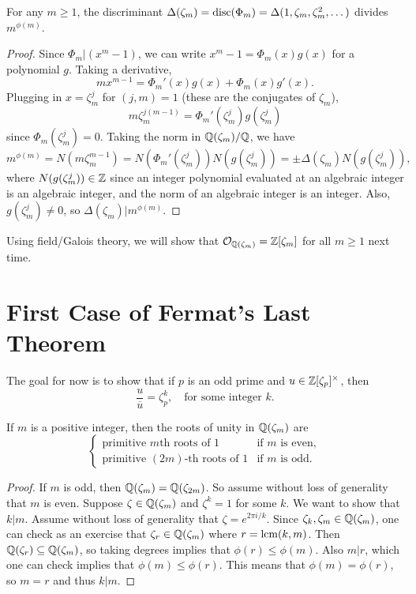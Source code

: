 \begin{lemma}
  For any $m \ge 1$, the
  discriminant $\Delta(\zeta_m) = \operatorname{disc}(\Phi_m) = \Delta(1, \zeta_m, \zeta_m^2, \dots)$
  divides $m^{\phi(m)}$.
\end{lemma}

\begin{proof}
  Since $\Phi_m | (x^m - 1)$, we can write
  $x^m - 1 = \Phi_m(x) g(x)$ for a polynomial $g$.
  Taking
  a derivative,
  \[
    mx^{m - 1} = \Phi_m'(x) g(x) + \Phi_m(x) g'(x).
  \]
  Plugging in $x = \zeta_m^j$ for $(j, m) = 1$ (these
  are the conjugates of $\zeta_m$),
  \[
    m\zeta_m^{j(m - 1)} = \Phi_m'(\zeta_m^j) g(\zeta_m^j)
  \]
  since $\Phi_m(\zeta_m^j) = 0$. Taking the norm in
  $\mathbb{Q}(\zeta_m) / \mathbb{Q}$, we have
  \[
    m^{\phi(m)}
    = N(m \zeta_m^{m - 1})
    = N(\Phi_m'(\zeta_m^j)) N(g(\zeta_m^j))
    = \pm \Delta(\zeta_m) N(g(\zeta_m^j)),
  \]
  where $N(g(\zeta_m^j)) \in \mathbb{Z}$
  since an integer polynomial evaluated at an algebraic
  integer is an algebraic integer, and the norm of
  an algebraic integer is an integer. Also,
  $g(\zeta_m^j) \ne 0$, so $\Delta(\zeta_m) | m^{\phi(m)}$.
\end{proof}

\begin{remark}
  Using field/Galois theory, we will show
  that $\mathcal{O}_{\mathbb{Q}(\zeta_m)} = \mathbb{Z}[\zeta_m]$
  for all $m \ge 1$ next time.
\end{remark}

\section{First Case of Fermat's Last Theorem}

\begin{remark}
  The goal for now is to show that if
  $p$ is an odd prime and $u \in \mathbb{Z}[\zeta_p]^\times$,
  then
  \[
    \frac{u}{\overline{u}} = \zeta_p^k, \quad
    \text{for some integer $k$}.
  \]
\end{remark}

\begin{lemma}
  If $m$ is a positive integer, then the roots
  of unity in $\mathbb{Q}(\zeta_m)$ are
  \[
    \begin{cases}
      \text{primitive $m$th roots of $1$} & \text{if $m$ is even}, \\
      \text{primitive $(2m)$-th roots of $1$} & \text{if $m$ is odd}.
    \end{cases}
  \]
\end{lemma}

\begin{proof}
  If $m$ is odd, then $\mathbb{Q}(\zeta_m) = \mathbb{Q}(\zeta_{2m})$.
  So assume without loss of generality that $m$ is even.
  Suppose $\zeta \in \mathbb{Q}(\zeta_m)$
  and $\zeta^k = 1$ for some $k$. We want to show
  that $k | m$. Assume without loss of generality that
  $\zeta = e^{2\pi i / k}$. Since
  $\zeta_k, \zeta_m \in \mathbb{Q}(\zeta_{m})$, one can check
  as an exercise that
  $\zeta_r \in \mathbb{Q}(\zeta_{m})$ where $r = \operatorname{lcm}(k, m)$. Then
  $\mathbb{Q}(\zeta_r) \subseteq \mathbb{Q}(\zeta_m)$, so taking
  degrees implies that $\phi(r) \le \phi(m)$. Also
  $m | r$, which one can check
  implies that $\phi(m) \le \phi(r)$.
  This means that $\phi(m) = \phi(r)$, so
  $m = r$ and thus $k | m$.
\end{proof}
